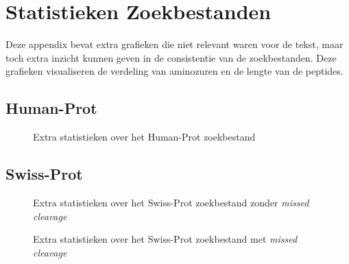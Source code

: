 \chapter{Statistieken Zoekbestanden}\label{ch:appendix-statistieken-zoekbestanden}
Deze appendix bevat extra grafieken die niet relevant waren voor de tekst, maar toch extra inzicht kunnen geven in de consistentie van de zoekbestanden.
Deze grafieken visualiseren de verdeling van aminozuren en de lengte van de peptides.

\section{Human-Prot}\label{sec:human-prot-stats}
\begin{figure}[H]
    \centering
    \hfill
    \caption{Extra statistieken over het Human-Prot zoekbestand}\label{fig:humanprot_search_other_stats}
\end{figure}

\section{Swiss-Prot}\label{sec:swiss-prot-stats}
\begin{figure}[H]
    \centering
    \hfill
    \caption{Extra statistieken over het Swiss-Prot zoekbestand zonder \textit{missed cleavage}}\label{fig:swissprot_search_no_missed_cleavage_other_stats}
\end{figure}
\begin{figure}[H]
    \centering
    \hfill
    \caption{Extra statistieken over het Swiss-Prot zoekbestand met \textit{missed cleavage}}\label{fig:swissprot_search_missed_cleavage_other_stats}
\end{figure}

